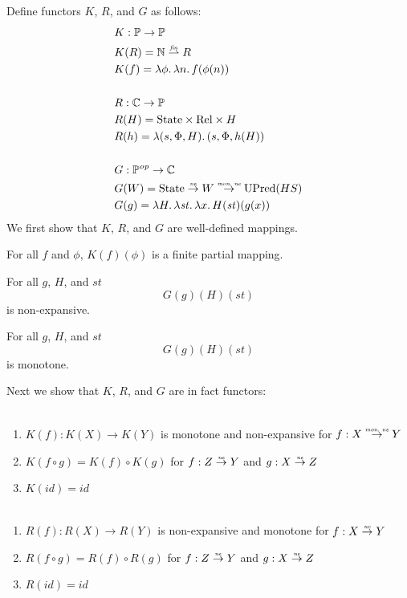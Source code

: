 \documentclass{article}
\newcommand{\forcenewline}{$\phantom{v}$\\}
\newcommand{\finparfun}{\stackrel{\textit{\tiny{fin}}}{\rightharpoonup}}
\newcommand{\monnefun}{\stackrel{\textit{\tiny{mon, ne}}}{\rightarrow}}
\newcommand{\nefun}{\stackrel{\textit{\tiny{ne}}}{\rightarrow}}
\newcommand{\id}{\var{id}}
\newcommand{\CatC}{\mathbb{C}}
\newcommand{\CatP}{\mathbb{P}}
\newcommand{\var}[1]{\mathit{#1}}
\newcommand{\plaindom}[1]{\mathrm{#1}}
\newcommand{\nats}{\mathbb{N}}
\newcommand{\Rel}{\plaindom{Rel}}
\newcommand{\States}{\plaindom{State}}
\newcommand{\UPred}[1]{\plaindom{UPred}(#1)}
\begin{document}
Define functors $K$, $R$, and $G$ as follows:
\begin{align*}
  & K : \CatP \rightarrow \CatP \\
  & K(R) = \nats \finparfun R \\
  & K(f) = \lambda \phi \ldotp \lambda n \ldotp f(\phi(n)) \\
  & \\
  & R : \CatC \rightarrow \CatP \\
  & R(H) = \States \times \Rel \times H\\
  & R(h) = \lambda (s,\Phi,H) \ldotp (s,\Phi,h(H))\\
  & \\
  & G : \CatP^{\var{op}} \rightarrow \CatC \\
  & G(W) = \States \nefun W \monnefun \UPred{HS} \\
  & G(g) = \lambda H \ldotp \lambda \var{st} \ldotp \lambda x \ldotp H (\var{st})(g(x))
\end{align*}
We first show that $K$, $R$, and $G$ are well-defined mappings.
\begin{lemma}
  \label{lem:world-finpar}
  For all $f$ and $\phi$, $K(f)(\phi)$ is a finite partial mapping.
\end{lemma}
\begin{lemma}
\label{lem:HSP-mon}
For all $g$, $H$, and $\var{st}$
\[
G(g) (H) (\var{st})
\]
is non-expansive.
\end{lemma}
\begin{lemma}
\label{lem:HSP-ne}
For all $g$, $H$, and $\var{st}$
\[
G(g) (H) (\var{st})
\]
is monotone.
\end{lemma}
Next we show that $K$, $R$, and $G$ are in fact functors:
\begin{lemma}[$K$ functorial]\forcenewline
\label{lem:K-func}
  \begin{enumerate}
  \item $K(f) : K(X) \rightarrow K(Y)$ is monotone and non-expansive for $f : X \monnefun Y$
  \item $K(f \circ g) = K(f) \circ K(g)$ for $f : Z \nefun Y$ and $g : X \nefun Z$
  \item $K(\id) = \id$
  \end{enumerate}
\end{lemma}

\begin{lemma}[$R$ functorial]\forcenewline
\label{lem:R-func}
  \begin{enumerate}
  \item $R(f) : R(X) \rightarrow R(Y)$ is non-expansive and monotone for $f : X \nefun Y$
  \item $R(f \circ g) = R(f) \circ R(g)$ for $f : Z \nefun Y$ and $g : X \nefun Z$
  \item $R(\id) = \id$
  \end{enumerate}
\end{lemma}
\end{document}
